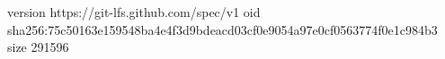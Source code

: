version https://git-lfs.github.com/spec/v1
oid sha256:75c50163e159548ba4e4f3d9bdeacd03cf0e9054a97e0cf0563774f0e1c984b3
size 291596
